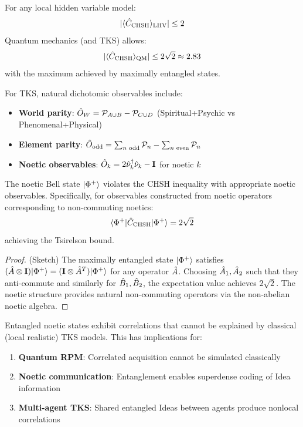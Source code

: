 \begin{theorem}
\label{thm:chsh}
For any local hidden variable model:
\[
|\langle \hat{C}_{\mathrm{CHSH}} \rangle_{\mathrm{LHV}}| \leq 2
\]
Quantum mechanics (and TKS) allows:
\[
|\langle \hat{C}_{\mathrm{CHSH}} \rangle_{\mathrm{QM}}| \leq 2\sqrt{2} \approx 2.83
\]
with the maximum achieved by maximally entangled states.
\end{theorem}

\begin{definition}
\label{def:noetic-bell-observables}
For TKS, natural dichotomic observables include:
\begin{itemize}
  \item \textbf{World parity}: $\hat{O}_W = \mathcal{P}_{A \cup B} - \mathcal{P}_{C \cup D}$ (Spiritual+Psychic vs Phenomenal+Physical)
  \item \textbf{Element parity}: $\hat{O}_{\mathrm{odd}} = \sum_{n \text{ odd}} \mathcal{P}_n - \sum_{n \text{ even}} \mathcal{P}_n$
  \item \textbf{Noetic observables}: $\hat{O}_k = 2\hat{\nu}_k^\dagger \hat{\nu}_k - \mathbf{I}$ for noetic $k$
\end{itemize}
\end{definition}

\begin{theorem}
\label{thm:bell-violation-tks}
The noetic Bell state $|\Phi^+\rangle$ violates the CHSH inequality with appropriate noetic observables. Specifically, for observables constructed from noetic operators corresponding to non-commuting noetics:
\[
\langle \Phi^+|\hat{C}_{\mathrm{CHSH}}|\Phi^+\rangle = 2\sqrt{2}
\]
achieving the Tsirelson bound.
\end{theorem}

\begin{proof}
(Sketch) The maximally entangled state $|\Phi^+\rangle$ satisfies $(\hat{A} \otimes \mathbf{I})|\Phi^+\rangle = (\mathbf{I} \otimes \hat{A}^T)|\Phi^+\rangle$ for any operator $\hat{A}$. Choosing $\hat{A}_1, \hat{A}_2$ such that they anti-commute and similarly for $\hat{B}_1, \hat{B}_2$, the expectation value achieves $2\sqrt{2}$. The noetic structure provides natural non-commuting operators via the non-abelian noetic algebra.
\end{proof}

\begin{corollary}
\label{cor:nonlocal-correlations}
Entangled noetic states exhibit correlations that cannot be explained by classical (local realistic) TKS models. This has implications for:
\begin{enumerate}
  \item \textbf{Quantum RPM}: Correlated acquisition cannot be simulated classically
  \item \textbf{Noetic communication}: Entanglement enables superdense coding of Idea information
  \item \textbf{Multi-agent TKS}: Shared entangled Ideas between agents produce nonlocal correlations
\end{enumerate}
\end{corollary}

